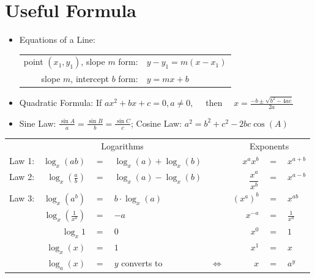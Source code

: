 \chapter*{Useful Formula}
\begin{itemize}
	\item Equations of a Line:
\begin{center}\begin{tabular}{rl}
		point $(x_1,y_1)$, slope $m$ form:&$y-y_1 = m(x - x_1)$\\
		slope $m$, intercept $b$ form:&$y=mx+b$
	\end{tabular}\end{center}
	\item Quadratic Formula:
	If $ax^2+bx+c=0$,\,$a\ne0,\quad$ then $\displaystyle\quad x = \frac{-b\pm \sqrt{b^2-4ac}}{2a}$
	\item Sine Law: $\frac{\sin A}{a}= \frac{\sin B}{b}=\frac{\sin C}{c}$; \hspace{0.2cm}Cosine Law: $a^2=b^2+c^2-2bc\cos(A)$
\end{itemize}
\begin{center}
		\renewcommand{\arraystretch}{1.2}
		\begin{tabular}{lrclcrcl}
			&\multicolumn{3}{c}{Logarithms}& &\multicolumn{3}{c}{Exponents}\\
			\cmidrule{1-4}\cmidrule{6-8}
			Law 1: &$ \log_x(ab) $&$=$&$ \log_x(a)+\log_x(b)  $&\hspace{1cm} &$x^a x^b$&$=$&$x^{a+b} $\\
			Law 2: &$ \log_x\left(\frac{a}{b}\right) $&$=$&$  \log_x(a)-\log_x(b) $& &$\dfrac{x^a}{x^b}$&$=$&$x^{a-b}  $\\
			Law 3: &$ \log_x(a^b) $&$=$&$ b\cdot\log_x(a)   $& &$(x^a)^b $&$=$&$x^{ab} $\\
			\cmidrule{1-4}\cmidrule{6-8}
			&$  \log_{x}\left(\frac{1}{x^a}\right) $&$=$&$-a   $& &$x^{-a} $&$=$&$\frac{1}{x^a} $\\
			&$ \log_{x}1  $&$=$&$ 0  $& &$x^0 $&$=$&$1 $\\
			&$ \log_x(x) $&$=$&$  1 $& &$x^1 $&$=$&$x $\\
			\bottomrule
			&$ \log_a(x) $&$=$&$y$\hspace{0.5cm} converts to& $\Leftrightarrow$ &$x $&$=$&$a^y $\\
			\bottomrule
		\end{tabular}
\end{center}
